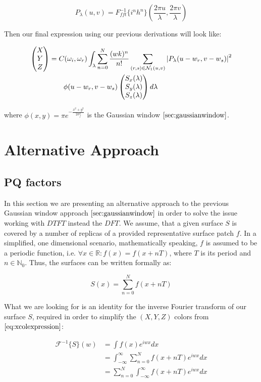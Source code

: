 \begin{equation}
P_{\lambda}(u,v) = {F}_{fft}^{-1}\{i^n h^n\}(\frac{2\pi u}{\lambda},\frac{2\pi v}{\lambda})
\end{equation}

Then our final expression using our previous derivations will look like:

\begin{equation}
\begin{split}
\colvec[X]{Y}{Z}& = C(\omega_i,\omega_r) \int_{\lambda} \sum_{n=0}^N  \frac{(wk)^n}{n!} \sum_{(r,s) \in \mathcal{N}_1(u,v)} \left| P_{\lambda}(u-w_r,v-w_s) \right|^2 \\
& \quad \quad  \phi(u-w_r, v-w_s) \colvec[S_x(\lambda)]{S_y(\lambda)}{S_z(\lambda)}d\lambda
\end{split}
\label{eq:finalexpression}
\end{equation}

where $\phi(x,y) = \pi e^{-\frac{x^2 + y^2}{2\sigma_{f}^2}}$ is the Gaussian window $\ref{sec:gaussianwindow}$.

\section{Alternative Approach}
\subsection{PQ factors}
\label{sec:pq}
In this section we are presenting an alternative approach to the previous Gaussian window approach 
$\ref{sec:gaussianwindow}$ 
in order to solve the issue working with $DTFT$ instead the $DFT$. We assume, that a given surface $S$ is covered by a number of replicas of a provided representative surface patch $f$. In a simplified, one dimensional scenario, mathematically speaking, $f$ is assumed to be a periodic function, i.e. $\forall x \in \mathds{R} : f(x) = f(x+nT)$, where $T$ is its period and $n \in \mathds{N}_{0}$. Thus, the surfaces can be written formally as:

\begin{equation}
  S(x) = \sum_{n=0}^N f(x+nT)
\label{eq:replicatedpatchsurface}
\end{equation}

What we are looking for is an identity for the inverse Fourier transform of our surface $S$, required in order to simplify the $(X,Y,Z)$ colors from $\ref{eq:xcolexpression}$:

\begin{align}
\mathcal{F}^{-1}\{S\}(w)
& =\int f(x) e^{iwx}dx \nonumber \\
& =\int_{-\infty}^{\infty} \sum_{n=0}^{N} f(x+nT) e^{iwx}dx \nonumber \\
& =\sum_{n=0}^{N} \int_{-\infty}^{\infty} f(x+nT) e^{iwx}dx
\label{eq:pqsinit}
\end{align}

